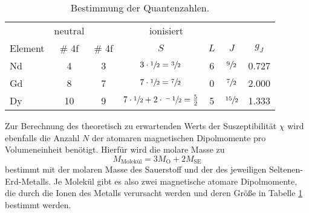     \begin{table}
        \centering
        \caption{Bestimmung der Quantenzahlen.}
        \label{tab:Theo1}
        \begin{tabular}{l c c c c c c}
            \toprule
             & 
            neutral & 
            \multicolumn{4}{c}{ionisiert} \\
            \cmidrule(lr){2-2} \cmidrule(lr){3-7}
            Element &
            \# 4f & 
            \# 4f &
            $S$ & 
            $L$ & 
            $J$ &
            $g_J$ \\
            \midrule
            Nd &  4 & 3 & $3\cdot\sfrac{1}{2}=\sfrac{3}{2}$                       & 6 & $\sfrac{9}{2}$  & 0.727 \\
            Gd &  8 & 7 & $7\cdot\sfrac{1}{2}=\sfrac{7}{2}$                       & 0 & $\sfrac{7}{2}$ & 2.000 \\
            Dy & 10 & 9 & $7\cdot\sfrac{1}{2}+2\cdot\sfrac{-1}{2}=\frac{5}{2}$    & 5 & $\sfrac{15}{2}$ & 1.333 \\
            \bottomrule
        \end{tabular}
    \end{table}

    Zur Berechnung des theoretisch zu erwartenden Werts der Suszeptibilität $\chi$ wird ebenfalls die Anzahl $N$ der atomaren magnetischen 
    Dipolmomente pro Volumeneinheit benötigt. 
    Hierfür wird die molare Masse zu 
    \begin{equation*}
        M_\text{Molekül}=3M_\text{O}+2M_\text{SE}
    \end{equation*}
    bestimmt mit der molaren Masse des Sauerstoff und der des jeweiligen Seltenen-Erd-Metalls. 
    Je Molekül gibt es also zwei magnetische atomare Dipolmomente, die durch die Ionen des Metalls verursacht werden und 
    deren Größe in Tabelle \ref{tab:Theo1} bestimmt werden.

